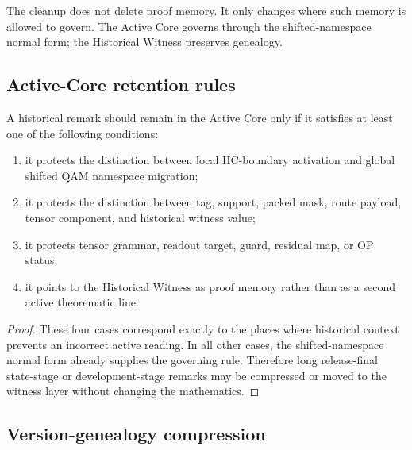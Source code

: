 \begin{remark}
\label{rem:v401-no-deletion-proof-memory}
The cleanup does not delete proof memory. It only changes where such memory is
allowed to govern. The Active Core governs through the shifted-namespace normal form; the
Historical Witness preserves genealogy.
\end{remark}

\subsection{Active-Core retention rules}
\label{subsec:v401-active-core-retention-rules}

\begin{proposition}
\label{prop:v401-active-core-retention-rule}
A historical remark should remain in the Active Core only if it satisfies at
least one of the following conditions:
\begin{enumerate}[leftmargin=*]
 \item it protects the distinction between local HC-boundary activation
 and global shifted QAM namespace migration;
 \item it protects the distinction between tag, support, packed mask, route
 payload, tensor component, and historical witness value;
 \item it protects tensor grammar, readout target, guard, residual map, or OP
 status;
 \item it points to the Historical Witness as proof memory rather than as a
 second active theorematic line.
\end{enumerate}
\end{proposition}

\begin{proof}
These four cases correspond exactly to the places where historical context
prevents an incorrect active reading. In all other cases, the shifted-namespace normal form
already supplies the governing rule. Therefore long release-final state-stage or
development-stage remarks may be compressed or moved to the witness layer
without changing the mathematics.
\end{proof}

\subsection{Version-genealogy compression}
\label{subsec:v401-version-genealogy-compression}

